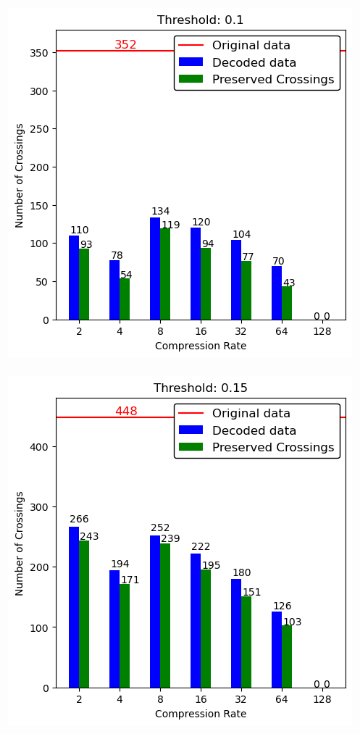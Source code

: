 \begin{appendices}
\begin{figure}[]
\begin{subfigure}{.5\textwidth}
		\end{subfigure}
		\hfill
		\begin{subfigure}{.5\textwidth}
			\includegraphics[width=\textwidth]{../../Images/spikes_threshold_01.png}
		\end{subfigure}
		\begin{subfigure}{.5\textwidth}
			\includegraphics[width=\textwidth]{../../Images/spikes_threshold_015.png}

\end{subfigure}
\end{figure}
\end{appendices}
